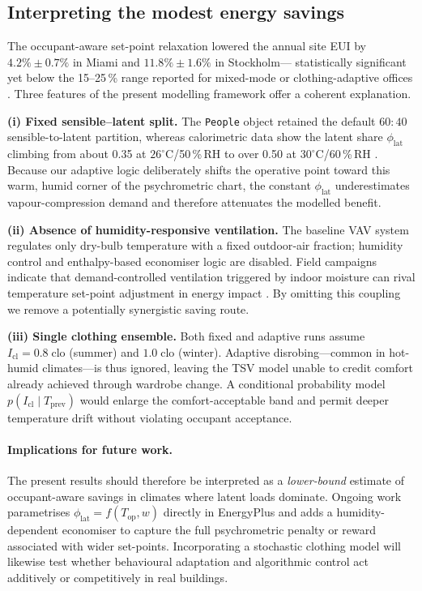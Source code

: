 \subsection{Interpreting the modest energy savings}\label{sec:disc_energy}

The occupant-aware set-point relaxation lowered the annual site EUI by
\(4.2\% \pm 0.7\%\) in Miami and \(11.8\% \pm 1.6\%\) in Stockholm—
statistically significant yet below the 15–25\,\% range reported for
mixed-mode or clothing-adaptive offices \cite{Kim2018AdaptiveSetpoint}.  Three
features of the present modelling framework offer a coherent
explanation.

\textbf{(i) Fixed sensible–latent split.}
The \texttt{People} object retained the default \(60{:}40\) sensible-to-latent
partition, whereas calorimetric data show the latent share
\(\phi_{\mathrm{lat}}\) climbing from about 0.35 at
\(26^{\circ}\text{C}\)/50\,\%\,RH to over 0.50 at
\(30^{\circ}\text{C}\)/60\,\%\,RH \cite{Cena2001HotAridComfort}.  Because our
adaptive logic deliberately shifts the operative point toward this warm,
humid corner of the psychrometric chart, the constant \(\phi_{\mathrm{lat}}\)
underestimates vapour-compression demand and therefore attenuates the
modelled benefit.

\textbf{(ii) Absence of humidity-responsive ventilation.}
The baseline VAV system regulates only dry-bulb temperature with a fixed
outdoor‐air fraction; humidity control and enthalpy-based economiser
logic are disabled.  Field campaigns indicate that demand-controlled
ventilation triggered by indoor moisture can rival temperature set-point
adjustment in energy impact \cite{Rupp2021HumidityDCV}.  By omitting this
coupling we remove a potentially synergistic saving route.

\textbf{(iii) Single clothing ensemble.}
Both fixed and adaptive runs assume \(I_{\mathrm{cl}}=0.8\;\text{clo}\)
(summer) and \(1.0\;\text{clo}\) (winter).  Adaptive disrobing—common in
hot-humid climates—is thus ignored, leaving the TSV model unable to
credit comfort already achieved through wardrobe change.  A conditional
probability model \(p(I_{\mathrm{cl}} \mid T_{\mathrm{prev}})\) would enlarge
the comfort-acceptable band and permit deeper temperature drift without
violating occupant acceptance.

\paragraph{Implications for future work.}
The present results should therefore be interpreted as a
\emph{lower‐bound} estimate of occupant-aware savings in climates where
latent loads dominate.  Ongoing work parametrises
\(\phi_{\mathrm{lat}}=f(T_{\mathrm{op}},w)\) directly in EnergyPlus and adds a
humidity-dependent economiser to capture the full psychrometric penalty
or reward associated with wider set-points.  Incorporating a stochastic
clothing model will likewise test whether behavioural adaptation and
algorithmic control act additively or competitively in real buildings.


